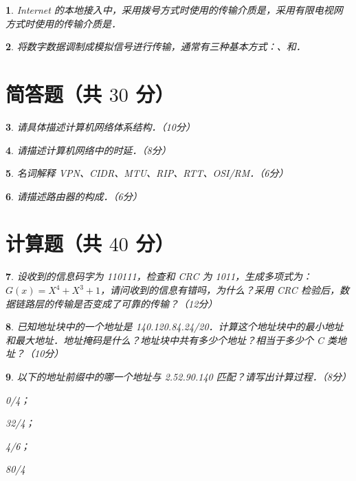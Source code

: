 \documentclass{ctexart}
\theoremstyle{change}
\newtheorem{ti}{}[section]
\def\hua{\uline{\hspace*{\fill}}}
\def\huahua{\uline{\hspace*{5pc}}}
\begin{document}
\begin{ti}
	Internet 的本地接入中，采用拨号方式时使用的传输介质是\huahua，采用有限电视网方式时使用的传输介质是\hua．
\end{ti}

\begin{ti}
	将数字数据调制成模拟信号进行传输，通常有三种基本方式：\hua、\hua 和\hua．
\end{ti}

\section{简答题（共 $30$ 分）}
\begin{ti}
	请具体描述计算机网络体系结构．（10分）
\end{ti}

\begin{ti}
	请描述计算机网络中的时延．（8分）
\end{ti}

\begin{ti}
	名词解释 VPN、CIDR、MTU、RIP、RTT、OSI/RM．（6分）
\end{ti}

\begin{ti}
	请描述路由器的构成．（6分）
\end{ti}

\section{计算题（共 $40$ 分）}
\begin{ti}
	设收到的信息码字为 110111，检查和 CRC 为 1011，生成多项式为：$G(x) = X^{4} + X^{3} + 1$，请问收到的信息有错吗，为什么？采用 CRC 检验后，数据链路层的传输是否变成了可靠的传输？（12分）
\end{ti}

\begin{ti}
	已知地址块中的一个地址是 140.120.84.24/20．计算这个地址块中的最小地址和最大地址．地址掩码是什么？地址块中共有多少个地址？相当于多少个 C 类地址？（10分）
\end{ti}

\begin{ti}
	以下的地址前缀中的哪一个地址与 2.52.90.140 匹配？请写出计算过程．（8分）

	\begin{inparaenum}
		\item 0/4；
		\item 32/4；
		\item 4/6；
		\item 80/4
	\end{inparaenum}
\end{ti}
\end{document}
